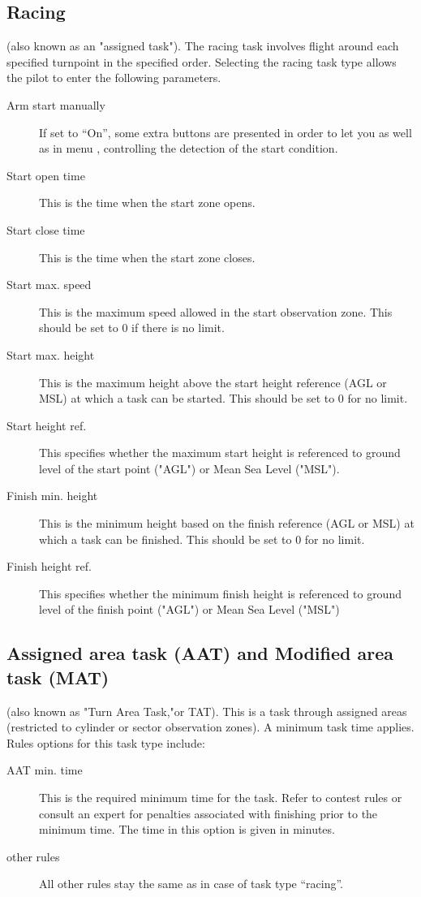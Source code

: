 \subsection*{Racing}
(also known as an "assigned task").  The racing task involves flight
around each specified turnpoint in the specified order.  Selecting the racing task
type allows the pilot to enter the following parameters.
  \begin{description}
  \item [Arm start manually] If set to ``On'', some extra buttons are presented
  in order to let you  as well as  in
  menu , controlling  the detection of the start condition.
  \item [Start open time] This is the time when the start zone opens.
  \item [Start close time] This is the time when the start zone closes.
  \item [Start max. speed] This is the maximum speed allowed in the start observation
    zone.  This should be set to 0 if there is no limit.
  \item [Start max. height] This is the maximum height above the start height
    reference (AGL or MSL) at which a task can be started.  This  should be set to
    0 for no limit.
  \item [Start height ref.] This specifies whether the maximum start height is
    referenced to ground level of the start point ("AGL") or Mean Sea Level ("MSL").
  \item [Finish min. height] This is the minimum height based on the finish
    reference (AGL or MSL) at which a task can be finished.  This should be set to
    0 for no limit.
  \item [Finish height ref.] This specifies whether the minimum finish height
    is referenced to ground level of the finish point ("AGL") or Mean Sea Level ("MSL")
  \end{description}

\subsection*{Assigned area task (AAT) and Modified area task (MAT)}
(also known as "Turn Area Task,"or TAT).  This is a task through assigned
areas (restricted to cylinder or sector observation zones).  A minimum task time
applies.  Rules options for this task type include:
  \begin{description}
  \item [AAT min. time]  This is the required minimum time for the task.  Refer
    to contest rules or consult an expert for penalties associated with finishing
    prior to the minimum time.  The time in this option is given in minutes.
  \item [other rules] All other rules stay the same as in case of task type
    ``racing''.
  \end{description}


